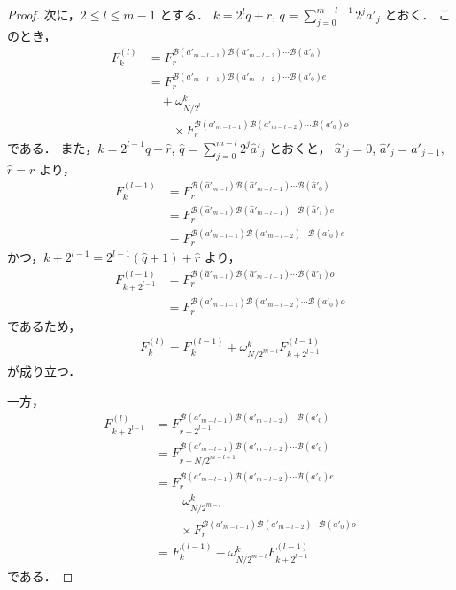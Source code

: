 \documentclass[twocolumn, uplatex, dvipdfmx]{jsarticle}
\renewcommand{\le}{\leqslant}
\numberwithin{equation}{section}
\theoremstyle{definition}
\begin{document}
\begin{proof}
	次に，$2\le l\le m-1$ とする．
	$k=2^lq+r$, $q=\sum_{j=0}^{m-l-1}2^ja'_j$ とおく．
	このとき，
	\begin{align*}
		F_k^{(l)}&=F_r^{\mathcal{B}(a'_{m-l-1})\mathcal{B}(a'_{m-l-2})\cdots\mathcal{B}(a'_0)}\\
		&=F_r^{\mathcal{B}(a'_{m-l-1})\mathcal{B}(a'_{m-l-2})\cdots\mathcal{B}(a'_0)e}\\
		&\quad+\omega_{N/2^l}^k\\
		&\quad\quad\times F_r^{\mathcal{B}(a'_{m-l-1})\mathcal{B}(a'_{m-l-2})\cdots\mathcal{B}(a'_0)o}
	\end{align*}
	である．
	また，$k=2^{l-1}\hat{q}+\hat{r}$, $\hat{q}=\sum_{j=0}^{m-l}2^j\hat{a}'_j$ とおくと，
	$\hat{a}'_j=0$, $\hat{a}'_j=a'_{j-1}$, $\hat{r}=r$ より，
	\begin{align*}
		F_k^{(l-1)}&=F_r^{\mathcal{B}(\hat{a}'_{m-l})\mathcal{B}(\hat{a}'_{m-l-1})\cdots\mathcal{B}(\hat{a}'_0)}\\
		&=F_r^{\mathcal{B}(\hat{a}'_{m-l})\mathcal{B}(\hat{a}'_{m-l-1})\cdots\mathcal{B}(\hat{a}'_1)e}\\
		&=F_r^{\mathcal{B}(a'_{m-l-1})\mathcal{B}(a'_{m-l-2})\cdots\mathcal{B}(a'_0)e}
	\end{align*}
	かつ，$k+2^{l-1}=2^{l-1}(\hat{q}+1)+\hat{r}$ より，
	\begin{align*}
		F_{k+2^{l-1}}^{(l-1)}&=F_r^{\mathcal{B}(\hat{a}'_{m-l})\mathcal{B}(\hat{a}'_{m-l-1})\cdots\mathcal{B}(\hat{a}'_1)o}\\
		&=F_r^{\mathcal{B}(a'_{m-l-1})\mathcal{B}(a'_{m-l-2})\cdots\mathcal{B}(a'_0)o}
	\end{align*}
	であるため，
	\begin{align*}
		F_k^{(l)}=F_k^{(l-1)}+\omega_{N/2^{m-l}}^kF_{k+2^{l-1}}^{(l-1)}
	\end{align*}
	が成り立つ．
	
	一方，
	\begin{align*}
		F_{k+2^{l-1}}^{(l)}&=F_{r+2^{l-1}}^{\mathcal{B}(a'_{m-l-1})\mathcal{B}(a'_{m-l-2})\cdots\mathcal{B}(a'_0)}\\
		&=F_{r+N/2^{m-l+1}}^{\mathcal{B}(a'_{m-l-1})\mathcal{B}(a'_{m-l-2})\cdots\mathcal{B}(a'_0)}\\
		&=F_r^{\mathcal{B}(a'_{m-l-1})\mathcal{B}(a'_{m-l-2})\cdots\mathcal{B}(a'_0)e}\\
		&\quad-\omega_{N/2^{m-l}}^k\\
		&\quad\quad\times F_r^{\mathcal{B}(a'_{m-l-1})\mathcal{B}(a'_{m-l-2})\cdots\mathcal{B}(a'_0)o}\\
		&=F_k^{(l-1)}-\omega_{N/2^{m-l}}^kF_{k+2^{l-1}}^{(l-1)}
	\end{align*}
	である．



\end{proof}
\end{document}
